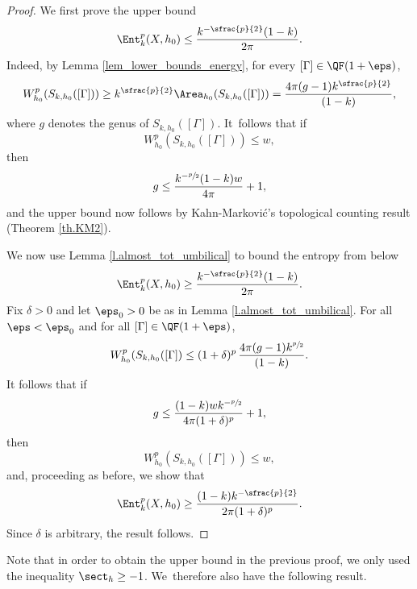 \begin{proof}
We first prove the upper bound
\begin{equation*}
\Ent^p_{k}(X,h_0)\leq\frac{k^{-\sfrac{p}{2}}(1-k)}{2\pi}.
\end{equation*}
Indeed, by Lemma \ref{lem_lower_bounds_energy}, for every $[\Gamma]\in\QF(1+\eps)$,
\begin{equation*}
W_{h_0}^{p}(S_{k,h_0}([\Gamma]))\geq k^{\sfrac{p}{2}}\Area_{h_0}(S_{k,h_0}([\Gamma]))=\frac{4\pi(g-1)k^{\sfrac{p}{2}}}{(1-k)},
\end{equation*}
where $g$ denotes the genus of $S_{k,h_0}([\Gamma])$. It~follows that if
\begin{equation*}
W_{h_0}^{p}(S_{k,h_0}([\Gamma])) \leq w,
\end{equation*}
then
\begin{equation*}
g \leq \frac{k^{-\sfrac{p}{2}}(1-k)w}{4\pi} + 1,
\end{equation*}
and the upper bound now follows by Kahn-Markovi\'c's topological counting result (Theorem \ref{th.KM2}).

We now use Lemma \ref{l.almost_tot_umbilical} to bound the entropy from below
\begin{equation*}
\Ent^p_{k}(X,h_0)\geq\frac{k^{-\sfrac{p}{2}}(1-k)}{2\pi}.
\end{equation*}
Fix $\delta>0$ and let $\eps_0>0$ be as in Lemma \ref{l.almost_tot_umbilical}. For all $\eps<\eps_0$ and for all $[\Gamma]\in\QF(1+\eps)$,
\begin{equation*}
W^{p}_{h_0}(S_{k,h_0}([\Gamma])\leq (1+\delta)^p\,\frac{4\pi(g-1)k^{\sfrac{p}{2}}}{(1-k)}.
\end{equation*}
It follows that if
\begin{equation*}
g \leq \frac{(1-k)w k^{-\sfrac{p}{2}}}{4\pi(1+\delta)^p} + 1,
\end{equation*}
then
\begin{equation*}
W_{h_0}^{p}(S_{k,h_0}([\Gamma])) \leq w,
\end{equation*}
and, proceeding as before, we show that
\begin{equation*}
\Ent^{p}_{k}(X,h_0)\geq\frac{(1-k)k^{-\sfrac{p}{2}}}{2\pi(1+\delta)^p}.
\end{equation*}
Since $\delta$ is arbitrary, the result follows.
\end{proof}

Note that in order to obtain the upper bound in the previous proof, we only used the inequality $\sect_h\geq -1$. We~therefore also have the following result.

